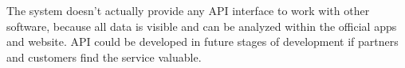 The system doesn't actually provide any API interface to work with other software, because all data is visible and can be analyzed within the official apps and website. API could be developed in future stages of development if partners and customers find the service valuable.